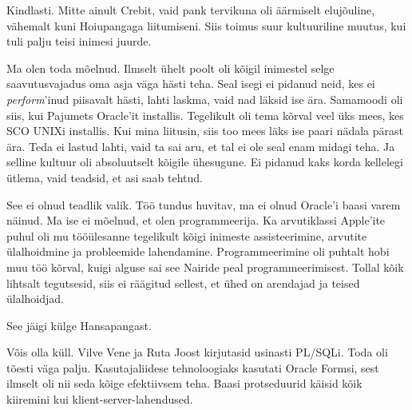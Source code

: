 Kindlasti. Mitte ainult Crebit, vaid pank tervikuna oli 
äärmiselt elujõuline, vähemalt kuni 
Hoiupangaga liitumiseni. Siis toimus suur kultuuriline 
muutus, kui tuli palju teisi inimesi juurde.


Ma olen toda mõelnud. Ilmselt ühelt poolt oli kõigil inimestel selge saavutusvajadus oma asja väga hästi teha. Seal 
isegi ei pidanud neid, kes ei \emph{perform}'inud 
piisavalt hästi, lahti laskma, vaid nad läksid ise ära. Samamoodi oli siis, kui 
Pajumets Oracle'it installis. 
Tegelikult oli tema kõrval veel üks mees, kes SCO UNIXi installis. 
Kui mina liitusin, siis too mees läks ise paari nädala pärast 
ära. Teda ei lastud lahti, vaid ta sai aru, et tal ei ole seal enam midagi teha. Ja selline kultuur 
oli absoluutselt kõigile ühesugune. Ei pidanud kaks korda kellelegi ütlema, 
vaid teadsid, et asi saab tehtud.


See ei olnud teadlik valik. Töö tundus huvitav, 
ma ei olnud Oracle'i baasi varem näinud. Ma ise ei mõelnud, et olen 
programmeerija. Ka arvutiklassi Apple'ite puhul oli mu tööülesanne 
tegelikult kõigi inimeste assisteerimine, arvutite ülalhoidmine ja
probleemide lahendamine. Programmeerimine oli 
puhtalt hobi muu töö kõrval, kuigi alguse sai see Nairide peal
programmeerimisest. Tollal kõik lihtsalt tegutsesid, siis ei räägitud sellest, et ühed on arendajad ja teised ülalhoidjad.


See jäigi külge Hansapangast. 


Võis olla küll. Vilve Vene ja Ruta 
Joost kirjutasid usinasti PL/SQLi. Toda oli tõesti väga palju. Kasutajaliidese 
tehnoloogiaks kasutati Oracle Formsi, 
sest ilmselt oli nii seda kõige efektiivsem teha. Baasi protseduurid käisid kõik kiiremini kui 
klient-server-lahendused.

